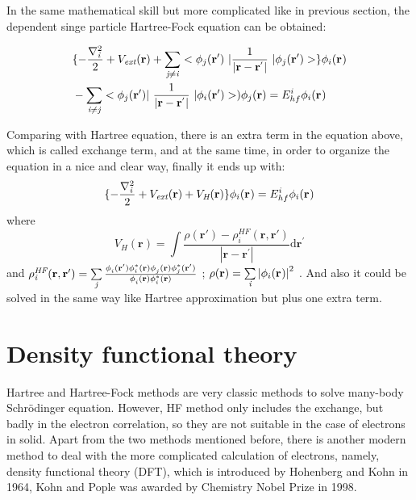 \documentclass[a4paper, 12pt, titlepage,oneside,drop]{kthesis}
\begin{document}
\noindent In the same mathematical skill but more complicated like in previous section, the dependent singe particle Hartree-Fock equation can be obtained:

\begin{equation}\begin{split}
& \{ -\frac{\nabla^{2}_{\textit i}}{2} + V_\textit{ext}(\textbf{r})+ \suminj<j><i> <\bwfn<j><'>\ | \frac{1}{|\textbf{r} - \textbf{r}^{'} |} \ | \bwfn<j><'>> \} \bwf<i><>  \\
& - \suminj<i><j>  < \bwfn<j><'>|\ \frac{1}{|\textbf{r} - \textbf{r}^{'} |} \ | \bwfn<i><'> >) \bwfn<j><>  = E^{i}_{hf} \bwf<i><>
\end{split}\end{equation}

\noindent Comparing with Hartree equation, there is an extra term in the equation above, which is called exchange term, and at the same time,
 in order to organize the equation in a nice and clear way, finally it ends up with:
\begin{equation}\begin{split}
\{ -\frac{\nabla^{2}_{\textit i}}{2} + V_\textit{ext}(\textbf{r}) +V_\textit{H}(\textbf{r}) \}  \bwf<i><>  = E^{i}_{hf}   \bwf<i><> 
\end{split}\end{equation}
where
\begin{equation}
 V_\textit{H}(\textbf{r})= \int \frac{\rho(\textbf{r}{'}) - \rho_{\textit{i}}^{\textit{HF}}(\textbf{r},\textbf{r}{'})}{|\textbf{r} - \textbf{r}^{'} |}  \mathrm{d}\textbf{r}^{'}
\end{equation}
and $ \rho_{\textit{i}}^{\textit{HF}}(\textbf{r},\textbf{r}{'}) = \sumi<j> \frac{\phi_{i}^{}(\textbf{r}{'}) \phi_{i}^{*}(\textbf{r}{}) \phi_{j}^{}(\textbf{r}{}) \phi_{j}^{*}(\textbf{r}{'})} {\phi_{i}^{}(\textbf{r}) \phi_{i}^{*}(\textbf{r})} $ 
; $\rho(\textbf{r}) = \sumi<i>  {|\bwf<i><>|}^{2}$ . And also it could be solved in the same way like Hartree approximation but plus one extra term.

\section{Density functional theory}
\noindent Hartree and Hartree-Fock methods are very classic methods to solve many-body Schrödinger equation. However, HF method only includes the exchange,
 but badly in the electron correlation, so they are not suitable in the case of electrons in solid. Apart from the two methods mentioned before, there is another modern method to deal with
 the more complicated calculation of electrons, namely, density functional theory (DFT), which is introduced by Hohenberg and
 Kohn in 1964, Kohn and Pople was awarded by Chemistry Nobel Prize in 1998.
\end{document}
